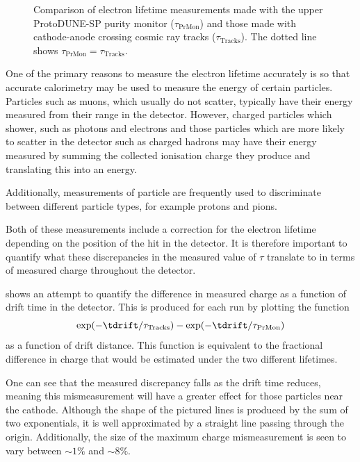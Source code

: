 \begin{figure}[h]
	\begin{adjustbox}{max totalsize=.6\linewidth, center}
		
	\end{adjustbox}
	\caption[Comparison of electron lifetime measurements made with purity monitors and cosmic ray tracks]{Comparison of electron lifetime measurements made with the upper ProtoDUNE-SP purity monitor ($\tau_{\text{PrMon}}$) and those made with cathode-anode crossing cosmic ray tracks ($\tau_{\text{Tracks}}$). The dotted line shows $\tau_{\text{PrMon}} = \tau_{\text{Tracks}}$.}
	\label{fig:lifetimeComp}
\end{figure}

One of the primary reasons to measure the electron lifetime accurately is so that accurate calorimetry may be used to measure the energy of certain particles.
Particles such as muons, which usually do not scatter, typically have their energy measured from their range in the detector.
However, charged particles which shower, such as photons and electrons and those particles which are more likely to scatter in the detector such as charged hadrons may have their energy measured by summing the collected ionisation charge they produce and translating this into an energy.

Additionally, measurements of particle \dedx are frequently used to discriminate between different particle types, for example protons and pions.

Both of these measurements include a correction for the electron lifetime depending on the position of the hit in the detector.
It is therefore important to quantify what these discrepancies in the measured value of $\tau$ translate to in terms of measured charge throughout the detector.

 shows an attempt to quantify the difference in measured charge as a function of drift time in the detector. 
This is produced for each run by plotting the function
\begin{equation}
	\exp(-\tdrift / \tau_{\text{Tracks}}) - \exp(-\tdrift / \tau_{\text{PrMon}})
\end{equation}
as a function of drift distance.
This function is equivalent to the fractional difference in charge that would be estimated under the two different lifetimes.

One can see that the measured discrepancy falls as the drift time reduces, meaning this mismeasurement will have a greater effect for those particles near the cathode. 
Although the shape of the pictured lines is produced by the sum of two exponentials, it is well approximated by a straight line passing through the origin.
Additionally, the size of the maximum charge mismeasurement is seen to vary between $\sim 1\%$ and $\sim 8\%$.

